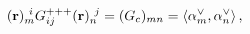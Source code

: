 \begin{equation}
\label{rootG} ({\bf r})_m^{~i}G^{+++}_{ij}({\bf r})_n^{~j} =
(G_c)_{mn}=\langle\alpha_m^\vee,\alpha_n^\vee\rangle\, ,
\end{equation} 

